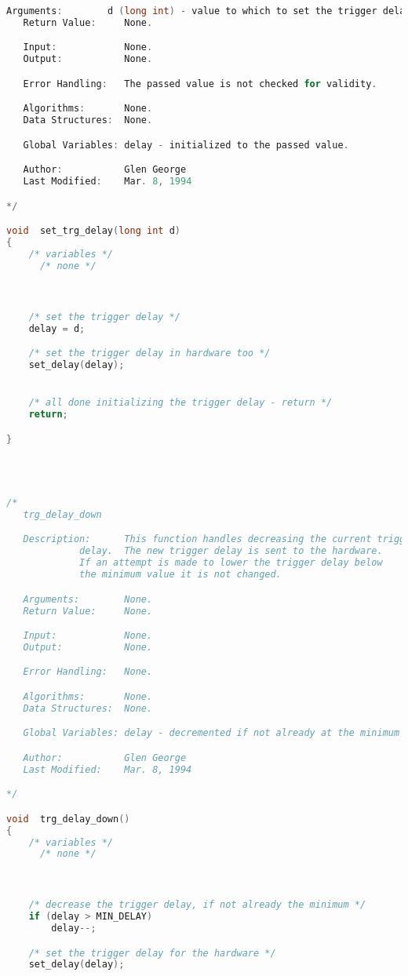 \begin{lstlisting}[language=C]
   Arguments:        d (long int) - value to which to set the trigger delay.
   Return Value:     None.

   Input:            None.
   Output:           None.

   Error Handling:   The passed value is not checked for validity.

   Algorithms:       None.
   Data Structures:  None.

   Global Variables: delay - initialized to the passed value.

   Author:           Glen George
   Last Modified:    Mar. 8, 1994

*/

void  set_trg_delay(long int d)
{
    /* variables */
      /* none */



    /* set the trigger delay */
    delay = d;

    /* set the trigger delay in hardware too */
    set_delay(delay);


    /* all done initializing the trigger delay - return */
    return;

}




/*
   trg_delay_down

   Description:      This function handles decreasing the current trigger
   		     delay.  The new trigger delay is sent to the hardware.
		     If an attempt is made to lower the trigger delay below
		     the minimum value it is not changed.

   Arguments:        None.
   Return Value:     None.

   Input:            None.
   Output:           None.

   Error Handling:   None.

   Algorithms:       None.
   Data Structures:  None.

   Global Variables: delay - decremented if not already at the minimum value.

   Author:           Glen George
   Last Modified:    Mar. 8, 1994

*/

void  trg_delay_down()
{
    /* variables */
      /* none */



    /* decrease the trigger delay, if not already the minimum */
    if (delay > MIN_DELAY)
        delay--;

    /* set the trigger delay for the hardware */
    set_delay(delay);



\end{lstlisting}
